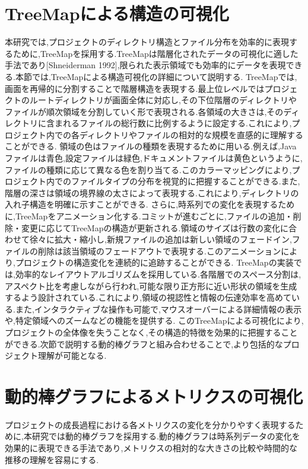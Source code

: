 \documentclass[12pt,twoside]{jbook}
\begin{document}
\section{TreeMapによる構造の可視化}
本研究では,プロジェクトのディレクトリ構造とファイル分布を効率的に表現するために,TreeMapを採用する.TreeMapは階層化されたデータの可視化に適した手法であり[Shneiderman 1992],限られた表示領域でも効率的にデータを表現できる.本節では,TreeMapによる構造可視化の詳細について説明する.
TreeMapでは,画面を再帰的に分割することで階層構造を表現する.最上位レベルではプロジェクトのルートディレクトリが画面全体に対応し,その下位階層のディレクトリやファイルが順次領域を分割していく形で表現される.各領域の大きさは,そのディレクトリに含まれるファイルの総行数に比例するように設定する.これにより,プロジェクト内での各ディレクトリやファイルの相対的な規模を直感的に理解することができる.
領域の色はファイルの種類を表現するために用いる.例えば,Javaファイルは青色,設定ファイルは緑色,ドキュメントファイルは黄色というように,ファイルの種類に応じて異なる色を割り当てる.このカラーマッピングにより,プロジェクト内でのファイルタイプの分布を視覚的に把握することができる.また,階層の深さは領域の境界線の太さによって表現する.これにより,ディレクトリの入れ子構造を明確に示すことができる.
さらに,時系列での変化を表現するために,TreeMapをアニメーション化する.コミットが進むごとに,ファイルの追加・削除・変更に応じてTreeMapの構造が更新される.領域のサイズは行数の変化に合わせて徐々に拡大・縮小し,新規ファイルの追加は新しい領域のフェードイン,ファイルの削除は該当領域のフェードアウトで表現する.このアニメーションにより,プロジェクトの構造変化を連続的に追跡することができる.
TreeMapの実装では,効率的なレイアウトアルゴリズムを採用している.各階層でのスペース分割は,アスペクト比を考慮しながら行われ,可能な限り正方形に近い形状の領域を生成するよう設計されている.これにより,領域の視認性と情報の伝達効率を高めている.また,インタラクティブな操作も可能で,マウスオーバーによる詳細情報の表示や,特定領域へのズームなどの機能を提供する.
このTreeMapによる可視化により,プロジェクトの全体像を失うことなく,その構造的特徴を効果的に把握することができる.次節で説明する動的棒グラフと組み合わせることで,より包括的なプロジェクト理解が可能となる.

\section{動的棒グラフによるメトリクスの可視化}
プロジェクトの成長過程における各メトリクスの変化を分かりやすく表現するために,本研究では動的棒グラフを採用する.動的棒グラフは時系列データの変化を効果的に表現できる手法であり,メトリクスの相対的な大きさの比較や時間的な推移の理解を容易にする.
\end{document}
